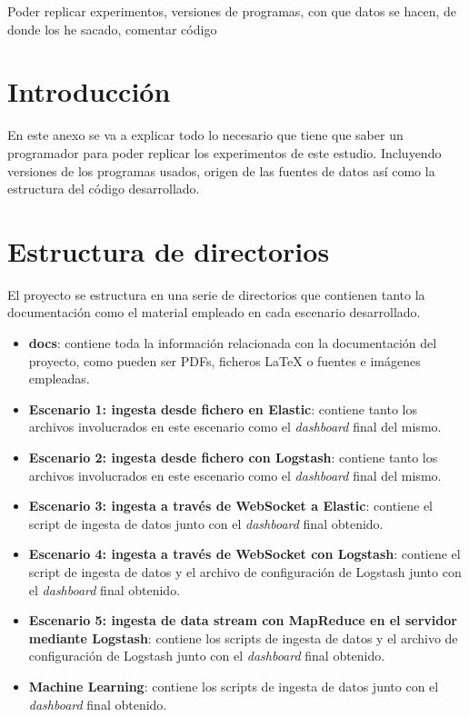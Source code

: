 
Poder replicar experimentos, versiones de programas, con que datos se hacen, de donde los he sacado, comentar código

\section{Introducción}
En este anexo se va a explicar todo lo necesario que tiene que saber un programador para poder replicar los experimentos de este estudio. Incluyendo versiones de los programas usados, origen de las fuentes de datos así como la estructura del código desarrollado. 

\section{Estructura de directorios}
El proyecto se estructura en una serie de directorios que contienen tanto la documentación como el material empleado en cada escenario desarrollado.
\begin{itemize}
    \item \textbf{docs}: contiene toda la información relacionada con la documentación del proyecto, como pueden ser PDFs, ficheros LaTeX o fuentes e imágenes empleadas.
    \item \textbf{Escenario 1: ingesta desde fichero en Elastic}: contiene tanto los archivos involucrados en este escenario como el \textit{dashboard} final del mismo.
    \item \textbf{Escenario 2: ingesta desde fichero con Logstash}: contiene tanto los archivos involucrados en este escenario como el \textit{dashboard} final del mismo.
    \item \textbf{Escenario 3: ingesta a través de WebSocket a Elastic}: contiene el script de ingesta de datos junto con el \textit{dashboard} final obtenido.
    \item \textbf{Escenario 4: ingesta a través de WebSocket con Logstash}: contiene el script de ingesta de datos y el archivo de configuración de Logstash junto con el \textit{dashboard} final obtenido.
    \item \textbf{Escenario 5: ingesta de data stream con MapReduce en el servidor mediante Logstash}: contiene los scripts de ingesta de datos y el archivo de configuración de Logstash junto con el \textit{dashboard} final obtenido.
    \item \textbf{Machine Learning}: contiene los scripts de ingesta de datos junto con el \textit{dashboard} final obtenido.

\end{itemize}

